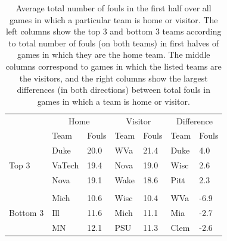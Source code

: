 \documentclass[
]{krantz}
\begin{document}
\begin{table}

\caption{\label{tab:table2chp11} Average total number of fouls in the first half over all games in which a particular team is home or visitor.  The left columns show the top 3 and bottom 3 teams according to total number of fouls (on both teams) in first halves of games in which they are the home team.  The middle columns correspond to games in which the listed teams are the visitors, and the right columns show the largest differences (in both directions) between total fouls in games in which a team is home or visitor.}
\centering
\begin{tabular}[t]{lllllll}
\toprule
\multicolumn{1}{c}{ } & \multicolumn{2}{c}{Home} & \multicolumn{2}{c}{Visitor} & \multicolumn{2}{c}{Difference} \\
\cmidrule(l{3pt}r{3pt}){2-3} \cmidrule(l{3pt}r{3pt}){4-5} \cmidrule(l{3pt}r{3pt}){6-7}
  & Team & Fouls & Team & Fouls & Team & Fouls\\
\midrule
 & Duke & 20.0 & WVa & 21.4 & Duke & 4.0\\
Top 3 & VaTech & 19.4 & Nova & 19.0 & Wisc & 2.6\\
 & Nova & 19.1 & Wake & 18.6 & Pitt & 2.3\\
 &  &  &  &  &  & \\
 & Mich & 10.6 & Wisc & 10.4 & WVa & -6.9\\
\addlinespace
Bottom 3 & Ill & 11.6 & Mich & 11.1 & Mia & -2.7\\
 & MN & 12.1 & PSU & 11.3 & Clem & -2.6\\
\bottomrule
\end{tabular}
\end{table}
\end{document}
